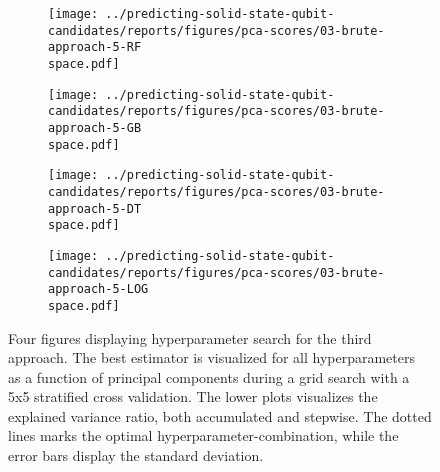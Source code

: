 \begin{figure}[!tbp]
  \begin{subfigure}[b]{0.5\textwidth}
    \texttt{[image: ../predicting-solid-state-qubit-candidates/reports/figures/pca-scores/03-brute-approach-5-RF\\space.pdf]}
    \caption{}
    \label{fig:q3-GB}
  \end{subfigure}%
  \hfill
  \begin{subfigure}[b]{0.5\textwidth}
    \texttt{[image: ../predicting-solid-state-qubit-candidates/reports/figures/pca-scores/03-brute-approach-5-GB\\space.pdf]}
    \caption{}
    \label{fig:q3-RF}
  \end{subfigure}

  \begin{subfigure}[b]{0.5\textwidth}
    \texttt{[image: ../predicting-solid-state-qubit-candidates/reports/figures/pca-scores/03-brute-approach-5-DT\\space.pdf]}
    \caption{}
    \label{fig:q3-DT}
  \end{subfigure}%
  \hfill
  \begin{subfigure}[b]{0.5\textwidth}
    \texttt{[image: ../predicting-solid-state-qubit-candidates/reports/figures/pca-scores/03-brute-approach-5-LOG\\space.pdf]}
    \caption{}
    \label{fig:q3-LOG}
  \end{subfigure}
  \caption{{Four figures displaying hyperparameter search for the third approach. The best estimator is visualized for all hyperparameters as a function of principal components during a grid search with a 5x5 stratified cross validation. The lower plots visualizes the explained variance ratio, both accumulated and stepwise. The dotted lines marks the optimal hyperparameter-combination, while the error bars display the standard deviation. }}
\end{figure}
